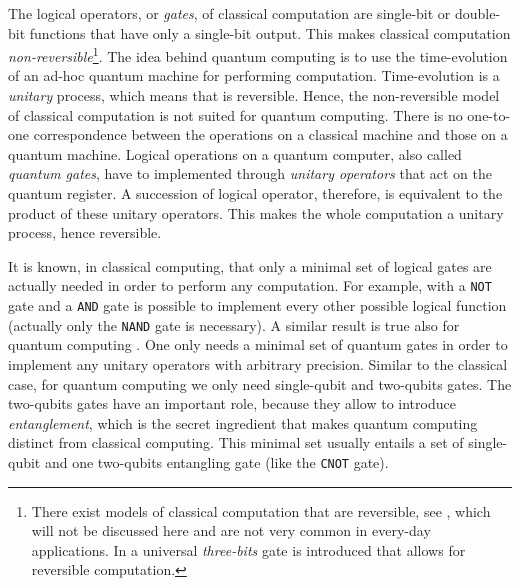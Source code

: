 The logical operators, or \emph{gates}, of classical computation are single-bit or double-bit functions that have only a single-bit output.
This makes classical computation \emph{non-reversible}\footnote{%
    There exist models of classical computation that are reversible, see \cite{fredkin1982logic}, which will not be discussed here and are not very common in every-day applications.
    In \cite{fredkin1982logic} a universal \emph{three-bits} gate is introduced that allows for reversible computation.%
}.
The idea behind quantum computing is to use the time-evolution of an ad-hoc quantum machine for performing computation.
Time-evolution is a \emph{unitary} process, which means that is reversible.
Hence, the non-reversible model of classical computation is not suited for quantum computing.
There is no one-to-one correspondence between the operations on a classical machine and those on a quantum machine.
Logical operations on a quantum computer, also called \emph{quantum gates}, have to implemented through \emph{unitary operators} that act on the quantum register.
A succession of logical operator, therefore, is equivalent to the product of these unitary operators.
This makes the whole computation a unitary process, hence reversible.

It is known, in classical computing, that only a minimal set of logical gates are actually needed in order to perform any computation.
For example, with a \texttt{NOT} gate and a \texttt{AND} gate is possible to implement every other possible logical function (actually only the \texttt{NAND} gate is necessary).
A similar result is true also for quantum computing \cite{barenco1995gates}.
One only needs a minimal set of quantum gates in order to implement any unitary operators with arbitrary precision.
Similar to the classical case, for quantum computing we only need single-qubit and two-qubits gates.
The two-qubits gates have an important role, because they allow to introduce \emph{entanglement}, which is the secret ingredient that makes quantum computing distinct from classical computing.
This minimal set usually entails a set of single-qubit and one two-qubits entangling gate (like the \texttt{CNOT} gate).

\medskip

